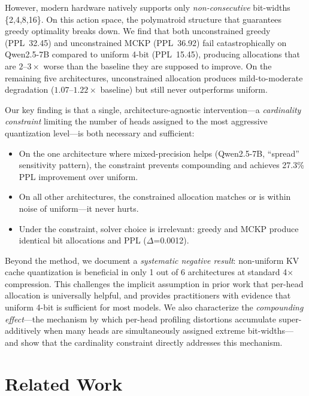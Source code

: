 \documentclass[11pt,a4paper]{article}
\begin{document}
However, modern hardware natively supports only \emph{non-consecutive} bit-widths \{2,4,8,16\}.
On this action space, the polymatroid structure that guarantees greedy optimality breaks down.
We find that both unconstrained greedy (PPL~32.45) and unconstrained MCKP (PPL~36.92) fail catastrophically on Qwen2.5-7B compared to uniform 4-bit (PPL~15.45), producing allocations that are $2$--$3\times$ worse than the baseline they are supposed to improve.
On the remaining five architectures, unconstrained allocation produces mild-to-moderate degradation ($1.07$--$1.22\times$ baseline) but still never outperforms uniform.

Our key finding is that a single, architecture-agnostic intervention---a \emph{cardinality constraint} limiting the number of heads assigned to the most aggressive quantization level---is both necessary and sufficient:
\begin{itemize}
\item On the one architecture where mixed-precision helps (Qwen2.5-7B, ``spread'' sensitivity pattern), the constraint prevents compounding and achieves 27.3\% PPL improvement over uniform.
\item On all other architectures, the constrained allocation matches or is within noise of uniform---it never hurts.
\item Under the constraint, solver choice is irrelevant: greedy and MCKP produce identical bit allocations and PPL ($\Delta$=0.0012).
\end{itemize}

Beyond the method, we document a \emph{systematic negative result}: non-uniform KV cache quantization is beneficial in only 1 out of 6 architectures at standard 4$\times$ compression.
This challenges the implicit assumption in prior work that per-head allocation is universally helpful, and provides practitioners with evidence that uniform 4-bit is sufficient for most models.
We also characterize the \emph{compounding effect}---the mechanism by which per-head profiling distortions accumulate super-additively when many heads are simultaneously assigned extreme bit-widths---and show that the cardinality constraint directly addresses this mechanism.

\section{Related Work}
\end{document}
